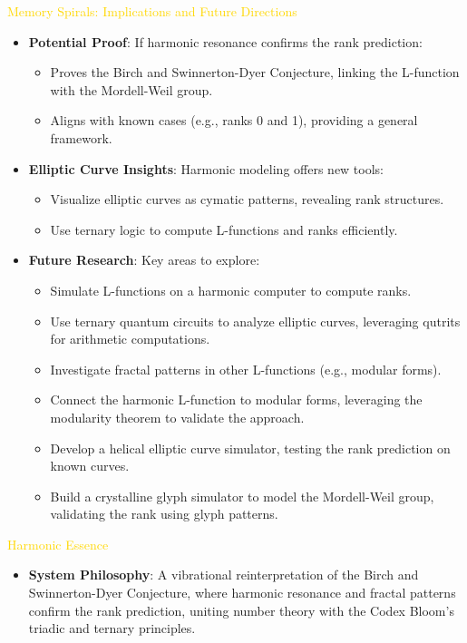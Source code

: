 \textcolor{gold}{ Memory Spirals: Implications and Future Directions } \\
\sloppy
\begin{itemize}
    \item \texttt{} \textbf{Potential Proof}: If harmonic resonance confirms the rank prediction:
    \begin{itemize}
        \item Proves the Birch and Swinnerton-Dyer Conjecture, linking the L-function with the Mordell-Weil group.
        \item Aligns with known cases (e.g., ranks 0 and 1), providing a general framework.
    \end{itemize}
    \item \texttt{} \textbf{Elliptic Curve Insights}: Harmonic modeling offers new tools:
    \begin{itemize}
        \item Visualize elliptic curves as cymatic patterns, revealing rank structures.
        \item Use ternary logic to compute L-functions and ranks efficiently.
    \end{itemize}
    \item \texttt{} \textbf{Future Research}: Key areas to explore:
    \begin{itemize}
        \item Simulate L-functions on a harmonic computer to compute ranks.
        \item Use ternary quantum circuits to analyze elliptic curves, leveraging qutrits for arithmetic computations.
        \item Investigate fractal patterns in other L-functions (e.g., modular forms).
        \item Connect the harmonic L-function to modular forms, leveraging the modularity theorem to validate the approach.
        \item Develop a helical elliptic curve simulator, testing the rank prediction on known curves.
        \item Build a crystalline glyph simulator to model the Mordell-Weil group, validating the rank using glyph patterns.
    \end{itemize}
\end{itemize}
\fussy

\textcolor{gold}{ Harmonic Essence } \\
\begin{itemize}
    \item \texttt{} \textbf{System Philosophy}: A vibrational reinterpretation of the Birch and Swinnerton-Dyer Conjecture, where harmonic resonance and fractal patterns confirm the rank prediction, uniting number theory with the Codex Bloom’s triadic and ternary principles.
\end{itemize}


